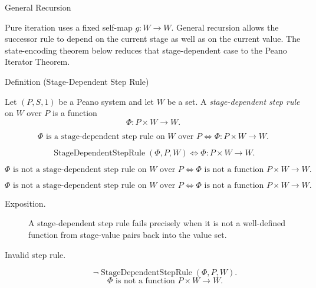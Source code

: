 \begin{topicbox}{General Recursion}
\begin{exposition}
Pure iteration uses a fixed self-map $g:W\to W$. General recursion allows the
successor rule to depend on the current stage as well as on the current value.
The state-encoding theorem below reduces that stage-dependent case to the
Peano Iterator Theorem.
\end{exposition}

\begin{definitionbox}{Definition (Stage-Dependent Step Rule)}
\begin{definition}
\label{def:stage-dependent-step-rule}
Let $(P,S,1)$ be a Peano system and let $W$ be a set. A
\emph{stage-dependent step rule} on $W$ over $P$ is a function
\[
\Phi:P\times W\to W.
\]
\end{definition}
\end{definitionbox}

\begin{remark*}
\[
\Phi \text{ is a stage-dependent step rule on } W \text{ over } P
\Longleftrightarrow
\Phi:P\times W\to W.
\]
\end{remark*}

\begin{remark*}
\[
\operatorname{StageDependentStepRule}(\Phi,P,W)
\Longleftrightarrow
\Phi:P\times W\to W.
\]
\end{remark*}

\begin{remark*}
\[
\Phi \text{ is not a stage-dependent step rule on } W \text{ over } P
\Longleftrightarrow
\Phi \text{ is not a function } P\times W\to W.
\]
\end{remark*}

\begin{remark*}
\[
\Phi \text{ is not a stage-dependent step rule on } W \text{ over } P
\Longleftrightarrow
\Phi \text{ is not a function } P\times W\to W.
\]
\end{remark*}

\begin{remark*}
\begin{description}
  \item[Exposition.]
  A stage-dependent step rule fails precisely when it is not a well-defined
  function from stage-value pairs back into the value set.
  \item[Invalid step rule.]
  \[
  \neg\operatorname{StageDependentStepRule}(\Phi,P,W).
  \]
  \[
  \Phi \text{ is not a function } P\times W\to W.
  \]
\end{description}
\end{remark*}


\end{topicbox}
